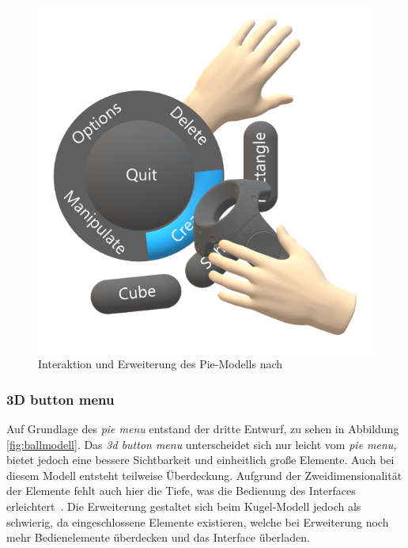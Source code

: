 \begin{figure}[h]
\captionsetup{width=.7\linewidth}
\includegraphics[scale=0.5]{Bilder/Hauptteil/konzept11a}
\centering
\caption{Interaktion und Erweiterung des Pie-Modells nach~\citep[p.~10]{wheelpickerpiemenu}}
\label{fig:piemenu2}
\end{figure}

\subsubsection*{3D button menu}
\noindent Auf Grundlage des \textit{pie menu} entstand der dritte Entwurf, zu sehen in Abbildung \ref{fig:ballmodell}. Das \textit{3d button menu} unterscheidet sich nur leicht vom \textit{pie menu}, bietet jedoch eine bessere Sichtbarkeit und einheitlich große Elemente. Auch bei diesem Modell entsteht teilweise Überdeckung. Aufgrund der Zweidimensionalität der Elemente fehlt auch hier die Tiefe, was die Bedienung des Interfaces erleichtert~\cite{theoryandpracticebook}. Die Erweiterung gestaltet sich beim Kugel-Modell jedoch als schwierig, da eingeschlossene Elemente existieren, welche bei Erweiterung noch mehr Bedienelemente überdecken und das Interface überladen.

